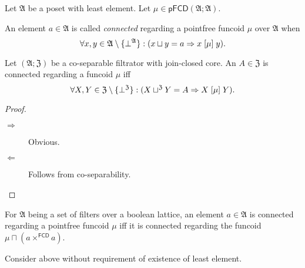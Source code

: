 Let $\mathfrak{A}$ be a poset with least element. Let $\mu\in\mathsf{pFCD}(\mathfrak{A};\mathfrak{A})$.
\begin{defn}
An element $a\in\mathfrak{A}$
is called \emph{connected} regarding a pointfree funcoid $\mu$ over
$\mathfrak{A}$ when 
\[
\forall x,y\in\mathfrak{A}\setminus\{\bot^{\mathfrak{A}}\}:(x\sqcup y=a\Rightarrow x\mathrel{\left[\mu\right]}y).
\]
\end{defn}
\begin{prop}
Let $(\mathfrak{A};\mathfrak{Z})$ be a co-separable filtrator with
join-closed core. An $A\in\mathfrak{Z}$ is connected regarding a
funcoid $\mu$ iff 
\[
\forall X,Y\in\mathfrak{Z}\setminus\{\bot^{\mathfrak{Z}}\}:(X\sqcup^{\mathfrak{Z}}Y=A\Rightarrow X\mathrel{\left[\mu\right]}Y).
\]
\end{prop}
\begin{proof}
~
\begin{description}
\item [{$\Rightarrow$}] Obvious.
\item [{$\Leftarrow$}] Follows from co-separability.
\end{description}
\end{proof}
\begin{obvious}
For $\mathfrak{A}$ being a set of filters over a boolean lattice,
an element $a\in\mathfrak{A}$ is connected regarding a pointfree
funcoid $\mu$ iff it is connected regarding the funcoid $\mu\sqcap(a\times^{\mathsf{FCD}}a)$.\end{obvious}
\begin{xca}
Consider above without requirement of existence of least element.
\end{xca}

